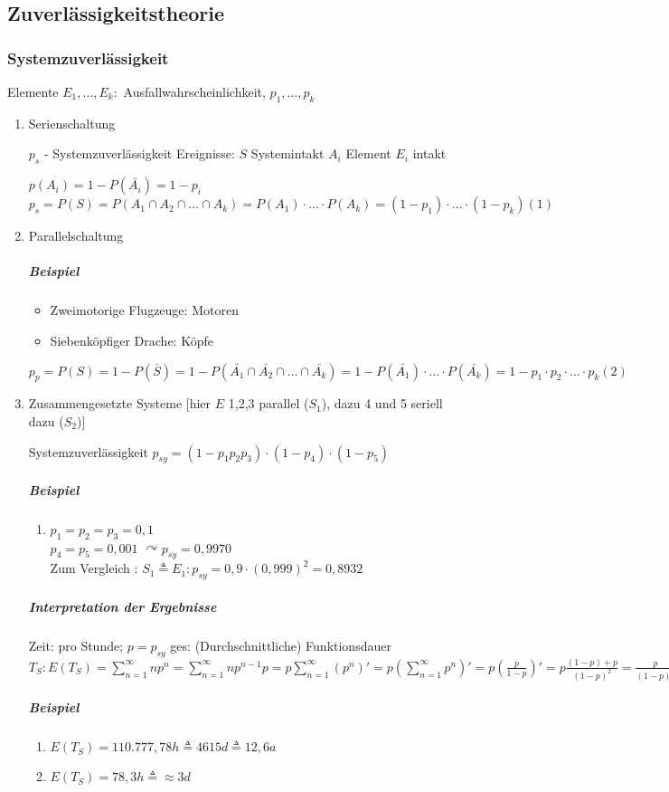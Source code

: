 \documentclass[a4paper]{scrartcl}
\begin{document}
\subsection{Zuverlässigkeitstheorie}
\subsubsection{Systemzuverlässigkeit}%
Elemente $E_1, \dots, E_k:$ Ausfallwahrscheinlichkeit, $p_1,\dots,p_k$
\begin{enumerate}
\item Serienschaltung



 $p_s$ - Systemzuverlässigkeit
 Ereignisse: $S$ Systemintakt
 $A_i$ Element $E_i$ intakt

$p(A_i) = 1 - P(\bar{A_i}) = 1- p_i$
$p_s = P(S) = P(A_1 \cap A_2 \cap \dots \cap A_k ) = P(A_1) \cdot \dots \cdot P(A_k) = (1- p_1) \cdot \dots \cdot (1- p_k) (1)$

\item Parallelschaltung
\subparagraph{Beispiel}
	\begin{itemize}
	\item Zweimotorige Flugzeuge: Motoren
	\item Siebenköpfiger Drache: Köpfe
\end{itemize}

$p_p = P(S) = 1- P(\bar{S}) = 1 - P(\bar{A_1} \cap \bar{A_2} \cap \dots \cap \bar{A_k} ) = 1- P(\bar{A_1}) \cdot \dots \cdot P(\bar{A_k}) = 1 - p_1 \cdot p_2 \cdot \dots \cdot p_k (2)$

\item Zusammengesetzte Systeme [hier $E$ 1,2,3 parallel ($S_1$), dazu 4 und 5 seriell dazu ($S_2$)]

Systemzuverlässigkeit $p_{sy} = (1- p_1p_2p_3) \cdot (1- p_4) \cdot (1-p_5)$
\subparagraph{Beispiel}
	\begin{enumerate}
	\item  $p_1 = p_2 = p_3 = 0,1$\\
	$p_4 = p_5 = 0,001$
	$\curvearrowright p_{sy} = 0,9970$\\
	Zum Vergleich : $S_1 \triangleq E_1 : p_{sy} = 0,9 \cdot (0,999)^2 = 0,8932$
	\end{enumerate}

	\subparagraph{Interpretation der Ergebnisse} Zeit: pro Stunde; $p = p_{sy}$
	ges: (Durchschnittliche) Funktionsdauer $T_S: E(T_S) = \sum\limits_{n=1}^\infty np^n = \sum\limits_{n=1}^\infty n p^{n-1} p = p \sum\limits_{n=1}^\infty (p^n)' = p (\sum\limits_{n=1}^\infty p^n)' = p (\frac{p}{1-p})' = p \frac{(1-p) + p}{(1-p)^2} = \frac{p}{(1-p)^2} $

	\subparagraph{Beispiel}
	\begin{enumerate}
	\item $E(T_S) = 110.777,78 h \triangleq 4615 d \triangleq 12,6 a$
	\item $E(T_S) = 78,3 h \triangleq \approx 3d$
	\end{enumerate}
\end{enumerate}
\end{document}
